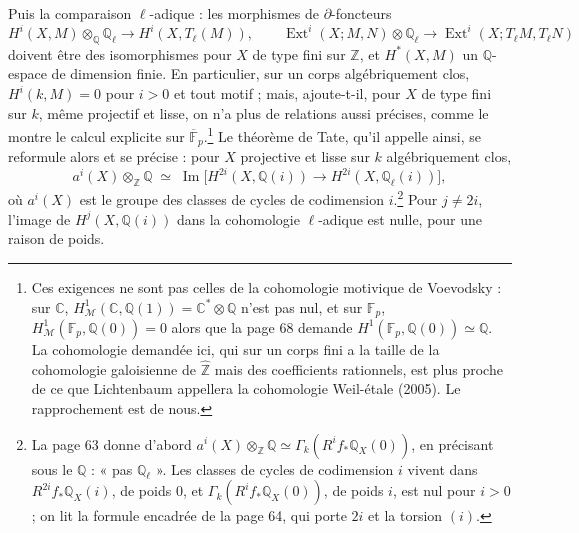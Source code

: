 \documentclass[11pt,a4paper]{article}
\begin{document}
Puis la comparaison $\ell$-adique : les morphismes de $\partial$-foncteurs
\[
H^{i}(X, M) \otimes_{\mathbb{Q}} \mathbb{Q}_{\ell} \longrightarrow
H^{i}(X, T_{\ell}(M)) ,
\qquad
\operatorname{Ext}^{i}(X ; M, N) \otimes \mathbb{Q}_{\ell} \longrightarrow
\operatorname{Ext}^{i}(X ; T_{\ell}M, T_{\ell}N)
\]
doivent être des isomorphismes pour $X$ de type fini sur $\mathbb{Z}$, et
$H^{*}(X, M)$ un $\mathbb{Q}$-espace de dimension finie. En particulier, sur un
corps algébriquement clos, $H^{i}(k, M) = 0$ pour $i > 0$ et tout
motif ; mais, ajoute-t-il, pour $X$ de type fini sur $k$, même projectif et
lisse, on n'a plus de relations aussi précises, comme le montre le calcul
explicite sur $\overline{\mathbb{F}}_{p}$.\footnote{Ces exigences ne sont pas celles de la cohomologie motivique de
Voevodsky : sur $\mathbb{C}$, $H^{1}_{\mathcal{M}}(\mathbb{C}, \mathbb{Q}(1)) =
\mathbb{C}^{*} \otimes \mathbb{Q}$ n'est pas nul, et sur $\mathbb{F}_{p}$,
$H^{1}_{\mathcal{M}}(\mathbb{F}_{p}, \mathbb{Q}(0)) = 0$ alors que la page 68
demande $H^{1}(\mathbb{F}_{p}, \mathbb{Q}(0)) \simeq \mathbb{Q}$. La cohomologie
demandée ici, qui sur un corps fini a la taille de la cohomologie galoisienne de
$\hat{\mathbb{Z}}$ mais des coefficients rationnels, est plus proche de ce que
Lichtenbaum appellera la cohomologie Weil-étale (2005). Le rapprochement est de
nous.} Le théorème de Tate, qu'il appelle ainsi, se reformule alors et se précise : pour $X$
projective et lisse sur $k$ algébriquement clos,
\[
a^{i}(X) \otimes_{\mathbb{Z}} \mathbb{Q} \;\simeq\;
\operatorname{Im}\bigl[ H^{2i}(X, \mathbb{Q}(i)) \longrightarrow
H^{2i}(X, \mathbb{Q}_{\ell}(i)) \bigr] ,
\]
où $a^{i}(X)$ est le groupe des classes de cycles de codimension
$i$.\footnote{La page 63 donne d'abord $a^{i}(X) \otimes_{\mathbb{Z}} \mathbb{Q}
\simeq \Gamma_{k}(R^{i}f_{*}\mathbb{Q}_{X}(0))$, en précisant sous le
$\mathbb{Q}$ : « pas $\mathbb{Q}_{\ell}$ ». Les classes de cycles de codimension
$i$ vivent dans $R^{2i}f_{*}\mathbb{Q}_{X}(i)$, de poids $0$, et
$\Gamma_{k}(R^{i}f_{*}\mathbb{Q}_{X}(0))$, de poids $i$, est nul pour $i > 0$ ;
on lit la formule encadrée de la page 64, qui porte $2i$ et la torsion
$(i)$.} Pour $j \neq 2i$, l'image de
$H^{j}(X, \mathbb{Q}(i))$ dans la cohomologie $\ell$-adique est nulle, pour une
raison de poids.
\end{document}
